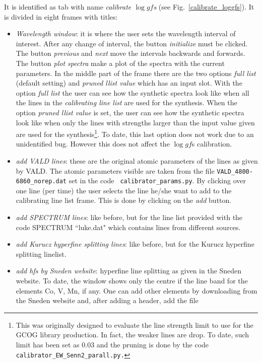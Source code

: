 \documentclass[a4paper,10pt]{article}
\newcommand\loggf{$\log gf$}
\begin{document}
It is identified as tab with name {\em calibrate \loggf s} (see
Fig.~\ref{calibrate_loggfs}).
It is divided in eight frames with titles:\\
\begin{itemize}
%
\item {\em Wavelength window}: it is where the user sets the wavelength interval of
interest. After any change of interval, the button {\em initialize} must be
clicked. The button {\em previous} and {\em next} move the intervals backwards and
forwards. The button {\em plot spectra} make a plot of the spectra with the
current parameters. In the middle part of the frame there are the two options
{\em full list} (default setting) and {\em pruned llist value} which has an
input slot. With the option {\em full list} the user can see how the
synthetic spectra look like when all the lines in the {\em calibrating line list}
are used for the synthesis. When the option {\em pruned llist value} is set,
the user can see how the synthetic spectra look like when only the lines
with strengths larger than the input value given are used for the
synthesis\footnote{This was originally designed to evaluate the line strength limit
to use for the GCOG library production. In fact, the weaker lines are drop.
To date, such limit has been set as 0.03 and the pruning is done by the code
{\tt calibrator\_EW\_Senn2\_parall.py.}}.
To date, this last option does not work due to an unidentified
bug. However this does not affect the \loggf s calibration.
%
\item {\em add VALD lines}: these are the original atomic parameters of the
lines as given by VALD. The atomic parameters visible are taken from the 
file {\tt VALD\_4800-6860\_norep.dat} set in the code {\tt
calibrator\_params.py}. By clicking over one line (per time) the user
selects the line he/she want to add to the calibrating line list frame. This
is done by clicking on the {\em add} button.
%
\item {\em add SPECTRUM lines}: like before, but for the line list provided
with the code SPECTRUM ``luke.dat" which contains lines from different
sources.
%
\item {\em add Kurucz hyperfine splitting lines}: like before, but for the Kurucz
hyperfine splitting linelist.
%
\item {\em add hfs by Sneden website}: hyperfine line splitting as given in
the Sneden website. To date, the window shows only the centre if the line
band for the elements Co, V, Mn, if any. One can add other elements by
downloading from the Sneden website and, after adding a header, add the file

\end{itemize}
\end{document}
